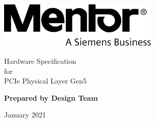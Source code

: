 \begin{titlepage}
    \begin{center}
\includegraphics[height=0.9in,width=3in]{images/mentor.png}
        \vspace*{3cm}
            
        \Huge
        Hardware Specification
        \\
            for
        \\
        PCIe Physical Layer Gen5
        \\
        \vspace{0.5cm}

        \vspace{1.5cm}
            
        \textbf{Prepared by Design Team}
            
         \vspace{8cm}
      
         January 2021
            
    \end{center}
\end{titlepage}
